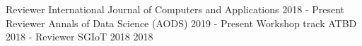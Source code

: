 

\begin{cventries}
	\cventry
	{Reviewer} %
	{ International Journal of Computers and Applications} %
	{2018 - Present } %
	{} %
	{}
	\vspace{-4.0mm}
	\cventry
	{Reviewer} %
	{Annals of Data Science (AODS)} %
	{2019 - Present} %
	{} %
	{}
	\vspace{-4.0mm}
	\cventry
	{Workshop track ATBD 2018 - Reviewer} %
	{SGIoT 2018} %
	{2018} %
	{} %
	{}
\end{cventries}
